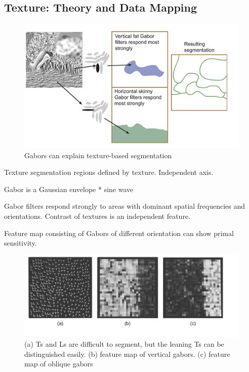 \begin{mdframed}\begin{multicols}{2}
\subsection{Texture: Theory and Data Mapping}
    \begin{figure}[H]
        \centering
        \includegraphics[width=\linewidth]{gabor_and_texture.png}
        \caption{Gabors can explain texture-based segmentation}
    \end{figure}

\begin{compactdesc}
    \item[Texture segmentation] regions defined by texture. Independent axis.
    \item[Gabor] is a Gaussian envelope * sine wave
    \item[Gabor filters] respond strongly to areas with dominant spatial
        frequencies and orientations. Contrast of textures is an independent
        feature.
    \item[Feature map] consisting of Gabors of different orientation can show
        primal sensitivity.
\end{compactdesc}

    \begin{figure}[H]
        \centering
        \includegraphics[width=0.7\linewidth]{gabors_and_classification.png}
        \caption{(a) Ts and Ls are difficult to segment, but the leaning Ts can
        be distinguished easily. (b) feature map of vertical gabors. (c)
        feature map of oblique gabors}
    \end{figure}

\end{multicols}\end{mdframed}



